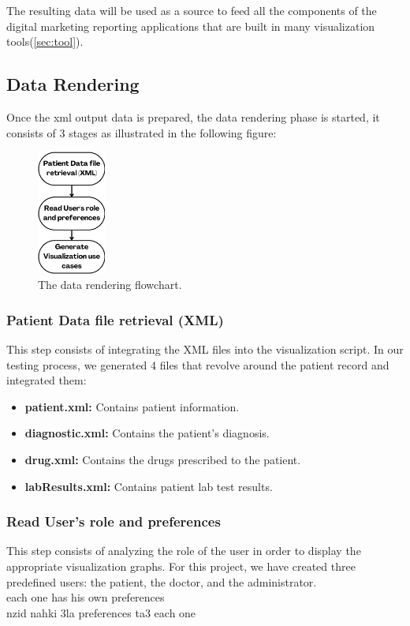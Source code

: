 \bigbreak
The resulting data will be used as a source to feed all the components of the digital marketing reporting applications that are built in many visualization tools(\ref{sec:tool}).

\subsection{Data Rendering}

Once the xml output data is prepared, the data rendering phase is started, it consists of 3 stages as illustrated in the following figure:

\begin{figure}[h!]
  \center
  \includegraphics[width=0.20\textwidth]{images/chapter3/rendering.png}
  \caption{The data rendering flowchart.}
  \label{fig:rendering}
\end{figure}

\subsubsection*{Patient Data file retrieval (XML)}
This step consists of integrating the XML files into the visualization script. In our testing process, we generated 4 files that revolve around the patient record and integrated them:
\begin{itemize}
  \renewcommand{\labelitemi}{$\bullet$}
  \item \textbf{patient.xml: }Contains patient information.
  \item \textbf{diagnostic.xml: }Contains the patient's diagnosis.
  \item \textbf{drug.xml: }Contains the drugs prescribed to the patient.
  \item \textbf{labResults.xml: }Contains patient lab test results.
\end{itemize}

\subsubsection*{Read User's role and preferences}
This step consists of analyzing the role of the user in order to display the appropriate visualization graphs. For this project, we have created three predefined users: the patient, the doctor, and the administrator.\\
each one has his own preferences \\
nzid nahki 3la preferences ta3 each one

